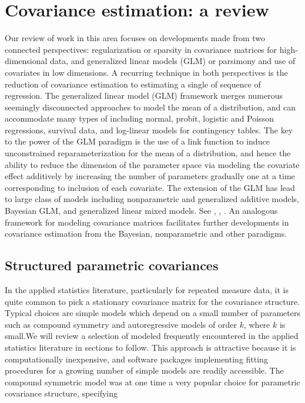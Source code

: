 

\chapter{Covariance estimation: a review} \label{background-review-chapter}

\indent

Our review of work in this area focuses on developments made from two connected perspectives: regularization or sparsity in covariance matrices for high-dimensional data, and generalized linear models (GLM) or parsimony and use of covariates in low dimensions. A recurring technique in both perspectives is the reduction of covariance estimation to estimating a single of sequence of regression. The generalized linear model (GLM) framework \cite{McCullagh1989} merges numerous seemingly disconnected approaches to model the mean of a distribution, and can accommodate many types of including normal, probit, logistic and Poisson regressions, survival data, and log-linear models for contingency tables. The key to the power of the GLM paradigm is the use of a link function to induce unconstrained reparameterization for the mean of a distribution, and hence the ability to reduce the dimension of the parameter space via modeling the covariate effect additively by increasing the number of parameters gradually one at a time corresponding to inclusion of each covariate. The extension of the GLM has lead to large class of models including nonparametric and generalized additive models, Bayesian GLM, and generalized linear mixed models. See \cite{hastie1990generalized},  \cite{dey2000generalized},  \cite{mcculloch2001generalized}. An analogous framework for modeling covariance matrices facilitates further developments in covariance estimation from the Bayesian, nonparametric and other paradigms.





\section{Structured parametric covariances} \label{chapter-1-parametric-covariance-models}


In the applied statistics literature, particularly for repeated measure data, it is quite common to pick a stationary covariance matrix for the covariance structure. Typical choices are simple models which depend on a small number of parameters such as compound symmetry and autoregressive models of order $k$, where $k$ is small.We will review a selection of modeled frequently encountered in the applied statistics literature in sections to follow. This approach is attractive because it is computationally inexpensive, and software packages implementing fitting procedures for a growing number of simple models are readily accessible. The compound symmetric model was at one time a very popular choice for parametric covariance structure, specifying


